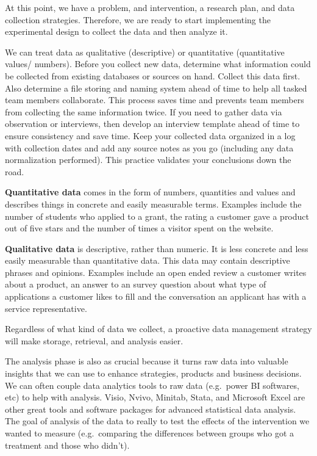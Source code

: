 \documentclass[]{book}
\begin{document}
At this point, we have a problem, and intervention, a research plan, and data collection strategies. Therefore, we are ready to start implementing the experimental design to collect the data and then analyze it.

We can treat data as qualitative (descriptive) or quantitative (quantitative values/ numbers). Before you collect new data, determine what information could be collected from existing databases or sources on hand. Collect this data first. Also determine a file storing and naming system ahead of time to help all tasked team members collaborate. This process saves time and prevents team members from collecting the same information twice. If you need to gather data via observation or interviews, then develop an interview template ahead of time to ensure consistency and save time. Keep your collected data organized in a log with collection dates and add any source notes as you go (including any data normalization performed). This practice validates your conclusions down the road.

\textbf{Quantitative data} comes in the form of numbers, quantities and values and describes things in concrete and easily measurable terms. Examples include the number of students who applied to a grant, the rating a customer gave a product out of five stars and the number of times a visitor spent on the website.

\textbf{Qualitative data} is descriptive, rather than numeric. It is less concrete and less easily measurable than quantitative data. This data may contain descriptive phrases and opinions. Examples include an open ended review a customer writes about a product, an answer to an survey question about what type of applications a customer likes to fill and the conversation an applicant has with a service representative.

Regardless of what kind of data we collect, a proactive data management strategy will make storage, retrieval, and analysis easier.

The analysis phase is also as crucial because it turns raw data into valuable insights that we can use to enhance strategies, products and business decisions. We can often couple data analytics tools to raw data (e.g.~power BI softwares, etc) to help with analysis. Visio, Nvivo, Minitab, Stata, and Microsoft Excel are other great tools and software packages for advanced statistical data analysis. The goal of analysis of the data to really to test the effects of the intervention we wanted to measure (e.g.~comparing the differences between groups who got a treatment and those who didn't).
\end{document}
